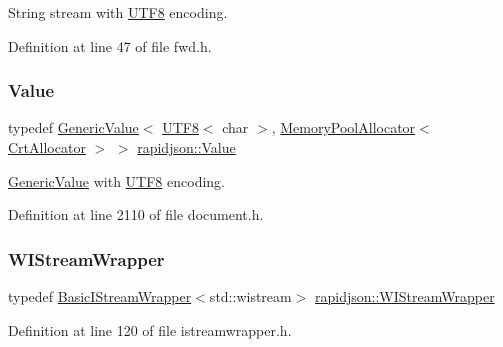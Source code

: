 String stream with \mbox{\hyperlink{structrapidjson_1_1_u_t_f8}{U\+T\+F8}} encoding. 



Definition at line 47 of file fwd.\+h.

\mbox{\label{namespacerapidjson_aa65fc9fb381b2cbc54f98673eadd6505}} 
\subsubsection{\texorpdfstring{Value}{Value}}
{\footnotesize\ttfamily typedef \mbox{\hyperlink{classrapidjson_1_1_generic_value}{Generic\+Value}}$<$ \mbox{\hyperlink{structrapidjson_1_1_u_t_f8}{U\+T\+F8}}$<$ char $>$, \mbox{\hyperlink{classrapidjson_1_1_memory_pool_allocator}{Memory\+Pool\+Allocator}}$<$ \mbox{\hyperlink{classrapidjson_1_1_crt_allocator}{Crt\+Allocator}} $>$ $>$ \mbox{\hyperlink{namespacerapidjson_aa65fc9fb381b2cbc54f98673eadd6505}{rapidjson\+::\+Value}}}



\mbox{\hyperlink{classrapidjson_1_1_generic_value}{Generic\+Value}} with \mbox{\hyperlink{structrapidjson_1_1_u_t_f8}{U\+T\+F8}} encoding. 



Definition at line 2110 of file document.\+h.

\mbox{\label{namespacerapidjson_a65a9e5d58bff23a6c446cc7722080320}} 
\subsubsection{\texorpdfstring{WIStreamWrapper}{WIStreamWrapper}}
{\footnotesize\ttfamily typedef \mbox{\hyperlink{classrapidjson_1_1_basic_i_stream_wrapper}{Basic\+I\+Stream\+Wrapper}}$<$std\+::wistream$>$ \mbox{\hyperlink{namespacerapidjson_a65a9e5d58bff23a6c446cc7722080320}{rapidjson\+::\+W\+I\+Stream\+Wrapper}}}



Definition at line 120 of file istreamwrapper.\+h.

\mbox{\label{namespacerapidjson_aed3cb4533d7293644a01ec707cf8282d}} 
